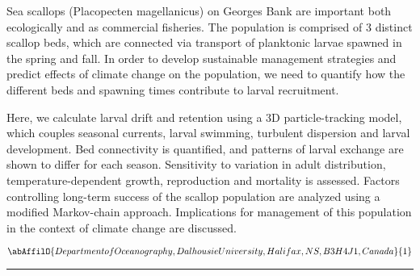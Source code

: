 \noindent Sea scallops (Placopecten magellanicus) on Georges Bank are important both ecologically and as commercial fisheries. The population is comprised of 3 distinct scallop beds, which are connected via transport of planktonic larvae spawned in the spring and fall. In order to develop sustainable management strategies and predict effects of climate change on the population, we need to quantify how the different beds and spawning times contribute to larval recruitment. 

Here, we calculate larval drift and retention using a 3D particle-tracking model, which couples seasonal currents, larval swimming, turbulent dispersion and larval development. Bed connectivity is quantified, and patterns of larval exchange are shown to differ for each season. Sensitivity to variation in adult distribution, temperature-dependent growth, reproduction and mortality is assessed. Factors controlling long-term success of the scallop population are analyzed using a modified Markov-chain approach. Implications for management of this population in the context of climate change are discussed.

\begin{center}
   \vspace{2 mm} \begin{center}
    \vspace{2 mm}\begin{center}
  
  $\abAffilO{Department of Oceanography, Dalhousie University, Halifax, NS, B3H 4J1, Canada}{1}$

  \end{center}
  \vspace{2 mm}
  \end{center}\end{center}
  \begin{center}\rule{0.70\linewidth}{0.5 pt}\end{center}

